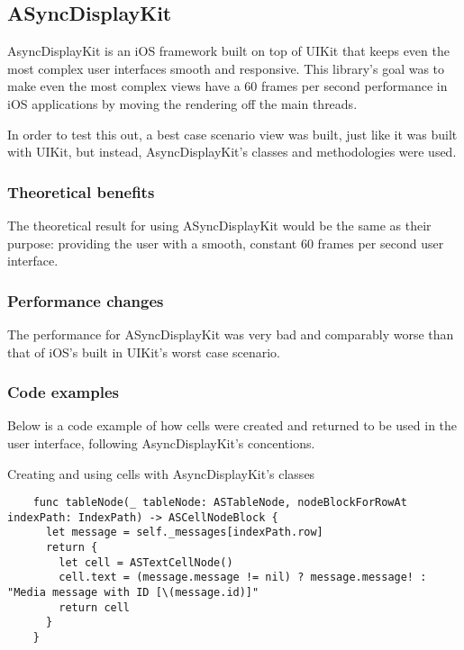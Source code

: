 \documentclass[a4paper,12pt]{article}
\begin{document}
\subsection{ASyncDisplayKit}
AsyncDisplayKit is an iOS framework built on top of UIKit that keeps even the most complex user interfaces smooth and responsive.\cite{IntroducingAsyncDisplayKit} This library's goal was to make even the most complex views have a 60 frames per second performance in iOS applications by moving the rendering off the main threads.

In order to test this out, a best case scenario view was built, just like it was built with UIKit, but instead, AsyncDisplayKit's classes and methodologies were used.

\subsubsection*{Theoretical benefits}
The theoretical result for using ASyncDisplayKit would be the same as their purpose: providing the user with a smooth, constant 60 frames per second user interface.

\subsubsection*{Performance changes}
The performance for ASyncDisplayKit was very bad and comparably worse than that of iOS's built in UIKit's worst case scenario.

\subsubsection*{Code examples}
Below is a code example of how cells were created and returned to be used in the user interface, following AsyncDisplayKit's concentions.
\begin{listing}[H]
  \caption{Creating and using cells with AsyncDisplayKit's classes}
  \begin{verbatim}
    func tableNode(_ tableNode: ASTableNode, nodeBlockForRowAt indexPath: IndexPath) -> ASCellNodeBlock {
      let message = self._messages[indexPath.row]
      return {
        let cell = ASTextCellNode()
        cell.text = (message.message != nil) ? message.message! : "Media message with ID [\(message.id)]"
        return cell
      }
    }
  \end{verbatim}
\end{listing}
\end{document}
